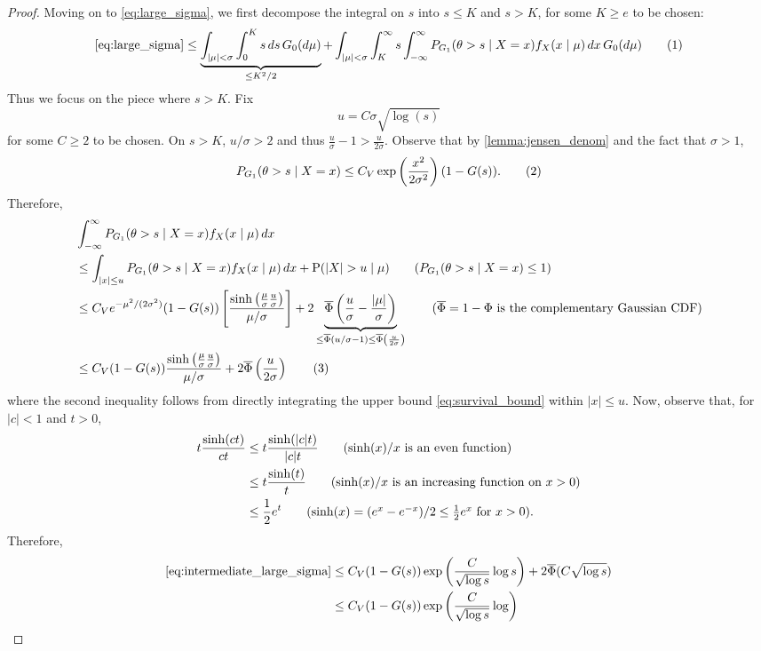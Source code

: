 \documentclass[10pt,a4paper]{amsart}
\renewcommand{\P}{\operatorname{P}}
\renewcommand{\bar}{\overline}
\newcommand{\bk}[1]{\left[{#1}\right]}
\newcommand\numberthis{\addtocounter{equation}{1}\tag{\theequation}}
\newcommand{\parens}[1]{\left({#1}\right)}
\newcommand{\pr}{\parens}
\begin{document}
\begin{proof}
Moving on to \eqref{eq:large_sigma}, we first decompose the integral on $s$ into $s \le K$
and $s > K$, for some $K \ge e$ to be chosen: \[
\eqref{eq:large_sigma} \le \underbrace{\int_{|\mu| < \sigma} \int_0^K s \,ds \,G_0(d\mu)}_
{\le K^{2}/2} + \int_
{|\mu| < \sigma} \int_K^\infty s \int_{-\infty}^\infty P_{G_1}(\theta > s \mid X=x) f_X
(x\mid \mu) \,dx\,G_0(d\mu) \numberthis \label{eq:large_sigma_bound}
\] Thus we focus on the piece where $s > K$. Fix \[u = C \sigma \sqrt{\log (s)}\] for some
 $C
\ge 2$ to be chosen. On $s > K$,
$u/\sigma > 2$ and thus $\frac{u}{\sigma} - 1 > \frac{u}{2\sigma}$.
Observe that by \cref{lemma:jensen_denom} and the fact that $\sigma > 1$, \[
P_{G_1}(\theta > s \mid X=x) \le C_V \exp\pr{\frac{x^2}{2\sigma^2}} (1-G(s)). \numberthis
\label{eq:survival_bound}
\]
Therefore, \begin{align*}
&\int_{-\infty}^\infty P_{G_1}(\theta > s \mid X=x) f_X
(x\mid \mu)\,dx \\
&\le \int_{|x| \le u} P_{G_1}(\theta > s \mid X=x) f_X
(x\mid \mu)\,dx + \P(|X|>u \mid \mu) \tag{$P_{G_1}(\theta > s \mid X=x) \le 1$}\\
&\le C_V e^{-\mu^2/(2\sigma^2)}(1-G(s)) \bk{
  \frac{\sinh\pr{\frac{\mu}{\sigma} \frac{u}{\sigma}}}{\mu/\sigma}
} + 2\underbrace{\bar\Phi\pr{\frac{u}{\sigma} - \frac{|\mu|}{\sigma}}}_{\le \bar\Phi
\pr{u/\sigma - 1} \le \bar\Phi\pr{\frac{u}{2 \sigma}}} \tag{$\bar\Phi = 1-\Phi$ is the
complementary Gaussian CDF}\\
&\le C_V(1-G(s)) \frac{\sinh\pr{\frac{\mu}{\sigma} \frac{u}{\sigma}}}{\mu/\sigma} +
2\bar\Phi\pr{\frac{u}{2 \sigma}} \numberthis \label{eq:intermediate_large_sigma}
\end{align*}
where the second inequality follows from directly integrating the upper bound 
\eqref{eq:survival_bound} within $|x| \le u$. Now, observe that, for $|c| < 1$ and $t >
0$, \begin{align*}
t \frac{\sinh(ct)}{ct} &\le t \frac{\sinh(|c|t)}{|c|t} \tag{$\sinh(x)/x$ is an even
function}  \\
&\le t \frac{\sinh(t)}{t} \tag{$\sinh(x)/x$ is an increasing function on $x > 0$} \\
&\le \frac{1}{2}e^{t} \tag{$\sinh(x) = (e^x-e^{-x})/2\le \frac{1}{2}e^x$ for $x > 0$}.
\end{align*}
Therefore, \begin{align*}
\eqref{eq:intermediate_large_sigma} &\le C_V (1-G(s)) \exp\pr{\frac{C}{\sqrt{\log s}} \log
s} + 2 \bar\Phi
(C \sqrt{\log s}) \\
&\le C_V (1-G(s)) \exp\pr{\frac{C}{\sqrt{\log s}} \log
}
\end{align*}
\end{proof}
\end{document}
